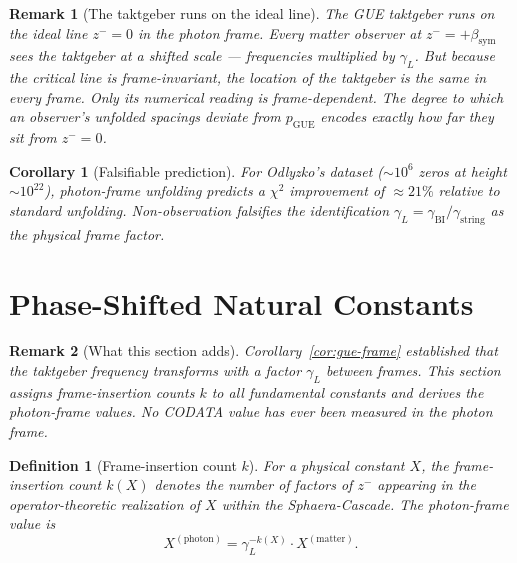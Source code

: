 \documentclass[12pt,a4paper]{article}
\newtheorem{corollary}[theorem]{Corollary}
\newtheorem{definition}[theorem]{Definition}
\newtheorem*{remark}{Remark}
\newcommand{\bsym}{\beta_{\mathrm{sym}}}
\newcommand{\gL}{\gamma_L}
\newcommand{\gstring}{\gamma_{\mathrm{string}}}
\newcommand{\gBI}{\gamma_{\mathrm{BI}}}
\newcommand{\zminus}{z^-}
\begin{document}
\begin{remark}[The taktgeber runs on the ideal line]
The GUE taktgeber runs on the ideal line $\zminus=0$ in the photon frame.
Every matter observer at $\zminus=+\bsym$ sees the taktgeber at a shifted
scale --- frequencies multiplied by $\gL$.
But because the critical line is frame-invariant, the \emph{location} of
the taktgeber is the same in every frame.
Only its \emph{numerical reading} is frame-dependent.
The degree to which an observer's unfolded spacings deviate from
$p_{\mathrm{GUE}}$ encodes exactly how far they sit from $\zminus=0$.
\end{remark}

\begin{corollary}[Falsifiable prediction]\label{cor:odlyzko}
For Odlyzko's dataset (${\sim}10^6$ zeros at height ${\sim}10^{22}$),
photon-frame unfolding predicts a $\chi^2$ improvement of $\approx 21\%$
relative to standard unfolding.
Non-observation falsifies the identification $\gL=\gBI/\gstring$ as the
physical frame factor.
\end{corollary}


\section{Phase-Shifted Natural Constants}
\label{sec:phase-constants}

\begin{remark}[What this section adds]
Corollary~\ref{cor:gue-frame} established that the taktgeber frequency
transforms with a factor $\gL$ between frames.
This section assigns frame-insertion counts $k$ to all fundamental
constants and derives the photon-frame values.
No CODATA value has ever been measured in the photon frame.
\end{remark}

\begin{definition}[Frame-insertion count $k$]
For a physical constant $X$, the \emph{frame-insertion count} $k(X)$ denotes
 the number of factors of $\zminus$ appearing in the operator-theoretic
 realization of $X$ within the Sphaera-Cascade.
The photon-frame value is
\[
  X^{(\mathrm{photon})} = \gL^{-k(X)}\cdot X^{(\mathrm{matter})}.
\]
\end{definition}
\end{document}
